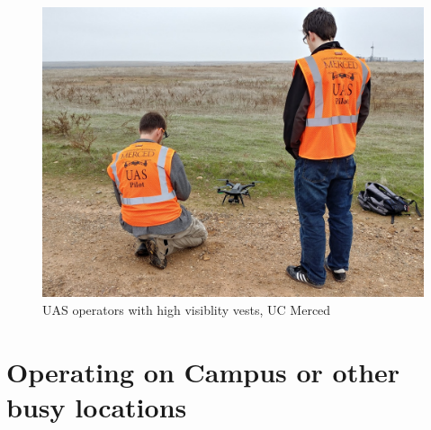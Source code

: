 \documentclass[
]{book}
\begin{document}
\begin{figure}

{\centering \includegraphics[width=0.75\linewidth]{images/UAS_vest} 

}

\caption{UAS operators with high visiblity vests, UC Merced}\label{fig:hivis}
\end{figure}

\hypertarget{operating-on-campus-or-other-busy-locations}{%
\section{Operating on Campus or other busy locations}\label{operating-on-campus-or-other-busy-locations}}
\end{document}
